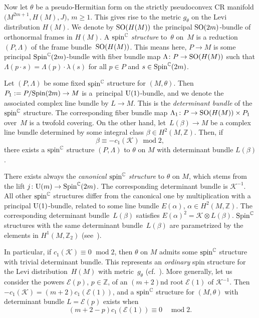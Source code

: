 \documentclass[10pt,a4paper]{amsart}
\numberwithin{equation}{section}
\newcommand{\ZZ}{\mathbb{Z}}
\newcommand{\CC}{\mathbb{C}}
\begin{document}
Now let $\theta$ be a pseudo-Hermitian form on the strictly pseudoconvex CR manifold $\big(M^{2m+1},\allowbreak H(M),J\big)$, $m\geq 1$.
This gives rise to the metric $g_\theta$ on the Levi distribution $H(M)$.
We denote by ${\rm SO} (H(M))$ the principal ${\rm SO}(2m)$-bundle of orthonormal frames in $H(M)$.
A {\em ${\rm spin}^\CC$ structure} to~$\theta$ on~$M$ is a reduction
$(P,\Lambda)$ of the frame bundle~${\rm SO}(H(M))$. This means here, $P\to M$ is some principal ${\rm Spin}^\CC(2m)$-bundle with fiber bundle map
$\Lambda\colon P\to {\rm SO}(H(M))$
such that $\Lambda(p\cdot s)=\Lambda(p)\cdot \lambda(s)$ for all $p\in P$ and $s\in {\rm Spin}^\CC(2m)$.

Let $(P,\Lambda)$ be some fixed ${\rm spin}^\CC$ structure for $(M,\theta)$. Then $P_1:=P/{\rm Spin}(2m)\to M$ is a~principal ${\rm U}(1)$-bundle,
and we denote the associated complex line bundle by $L\to M$. This is the {\em determinant bundle} of the ${\rm spin}^\CC$ structure.
The corresponding fiber bundle map $\Lambda_1\colon P\to {\rm SO}(H(M))\times P_1$ over~$M$ is a twofold covering.
On the other hand, let~$L(\beta)\to M$ be a complex line bundle
determined by some integral class $\beta\in H^2(M,\ZZ)$. Then, if
\[
\beta \equiv -c_1(\mathcal{K}) \ \operatorname{mod} 2,
\]
there exists a ${\rm spin}^\CC$ structure $(P,\Lambda)$ to $\theta$ on $M$
with determinant bundle $L(\beta)$.

There exists always the {\em canonical ${\rm spin}^\CC$ structure} to $\theta$ on $M$, which stems from the lift $j\colon {\rm U}(m)\to {\rm Spin}^{\CC}(2m)$.
The corresponding determinant bundle is $\mathcal{K}^{-1}$. All other ${\rm spin}^\CC$ structures differ from the canonical one by multiplication
with a principal ${\rm U}(1)$-bundle, related to some line bundle $E(\alpha)$, $\alpha\in H^2(M,\ZZ)$.
The corresponding determinant bundle~$L(\beta)$ satisfies $E(\alpha)^2=\mathcal{K}\otimes L(\beta)$.
${\rm Spin}^\CC$ structures with the same determinant bundle~$L(\beta)$ are parametrized by the
elements in $H^1(M,\ZZ_2)$ (see~\cite{LMS,Pet}).

In particular, if $c_1(\mathcal{K})\equiv 0$ $\operatorname{mod} 2$, then $\theta$ on $M$ admits some ${\rm spin}^\CC$ structure with trivial determinant bundle.
This represents an {\em ordinary} spin structure for the Levi distribution~$H(M)$ with metric~$g_\theta$ (cf.~\cite{LeiN1}).
More generally, let us consider the powers $\mathcal{E}(p)$, $p\in\ZZ$, of an $(m+2)$nd root $\mathcal{E}(1)$ of $\mathcal{K}^{-1}$.
Then $-c_1(\mathcal{K})=(m+2)c_1(\mathcal{E}(1))$, and a ${\rm spin}^\CC$ structure for $(M,\theta)$ with determinant bundle $L=\mathcal{E}(p)$ exists when
\begin{equation*}\label{condi1} (m+2-p)c_1(\mathcal{E}(1)) \equiv 0\quad \operatorname{mod} 2.\end{equation*}
\end{document}
